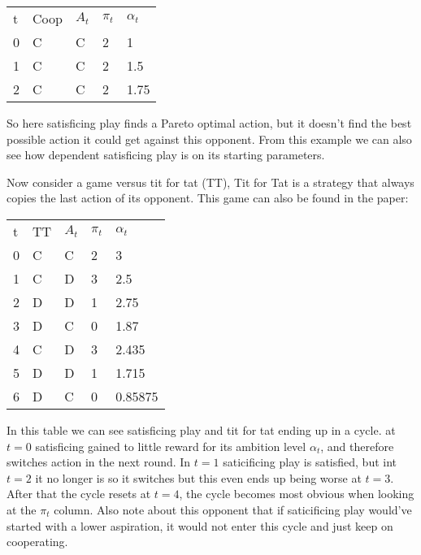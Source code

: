 \begin{tabular}{lllll}
  t & Coop & $A_t$ & $\pi_t$ & $\alpha_t$ \\
  0 & C     & C    & 2       & 1 \\
  1 & C     & C    & 2       & 1.5 \\
  2 & C     & C    & 2       & 1.75 \\
\end{tabular}

\toReview So here satisficing play finds a Pareto optimal action, but it doesn't find
the best possible action it could get against this opponent. From this example
we can also see how dependent satisficing play is on its starting parameters.

\toReview Now consider a game versus tit for tat (TT), Tit for Tat is a
strategy that always copies the last action of its opponent.
This game can also be found in the \citep{stimpson:2001} paper:

\begin{tabular}{lllll}
        t & TT & $A_t$ & $\pi_t$ & $\alpha_t$ \\
        0 & C     & C    & 2       & 3  \\
        1 & C     & D    & 3       & 2.5 \\
        2 & D     & D    & 1       & 2.75 \\
        3 & D     & C    & 0       & 1.87 \\
        4 & C     & D    & 3       & 2.435 \\
        5 & D     & D    & 1       & 1.715 \\
        6 & D     & C    & 0       & 0.85875 \\
\end{tabular}

In this table we can see satisficing play and tit for tat ending up in a cycle.
at $t=0$ satisficing gained to little reward for its ambition level $\alpha_t$,
and therefore switches action in the next round. In $t=1$ saticificing play
is satisfied, but int $t=2$ it no longer is so it switches but this even ends
up being worse at $t=3$. After that the cycle resets at $t=4$, the cycle becomes
most obvious when looking at the $\pi_t$ column. Also note about this opponent
that if saticificing play would've started with a lower aspiration, it would
not enter this cycle and just keep on cooperating.

